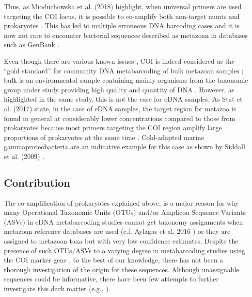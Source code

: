    Thus, as Mioduchowska et al. (2018) \cite{mioduchowska2018instances} highlight, when universal primers are used targeting the COI locus, it is possible to co-amplify both non-target numts and prokaryotes \cite{siddall2009barcoding}. This has led to multiple erroneous DNA barcoding cases and it is now not rare to encounter bacterial sequences described as metazoan in databases such as GenBank \cite{mioduchowska2018instances}.

   Even though there are various known issues \cite{deagle2014dna}, COI is indeed considered as the “gold standard” for community DNA metabarcoding of bulk metazoan samples \cite{andujar2018coi}; 
   bulk is an environmental sample containing mainly organisms from the taxonomic group under study providing high quality and quantity of DNA \cite{taberletanalysis}. 
   However, as highlighted in the same study, this is not the case for eDNA samples. 
   As Stat et al. (2017) \cite{stat2017ecosystem} state, in the case of eDNA samples, the target region for metazoa is found in general at considerably lower concentrations compared to those from prokaryotes because most primers targeting the COI region amplify large proportions of prokaryotes at the same time \cite{yang2013testing, yang2014using, collins2019non}. 
   Cold-adapted marine gammaproteobacteria are an indicative example for this case as shown by Siddall et al. (2009) \cite{siddall2009barcoding}.



   \subsection{Contribution}
   \label{sec:darn-contribution}

   The co-amplification of prokaryotes explained above, is a major reason for why many Operational Taxonomic Units (OTUs) and/or Amplicon Sequence Variants (ASVs) in eDNA metabarcoding studies cannot get taxonomy assignments when metazoan reference databases are used (c.f. Aylagas et al. 2016 \cite{aylagas2016benchmarking}) or they are assigned to metazoan taxa but with very low confidence estimates. 
   Despite the presence of such OTUs/ASVs to a varying degree in metabarcoding studies using the COI marker gene \cite{siddall2009barcoding}, to the best of our knowledge, there has not been a thorough investigation of the origin for these sequences. 
   Although unassignable sequences could be informative, there have been few attempts to further investigate this dark matter (e.g., \cite{sinniger2016worldwide, haenel2017ngs}).
   
